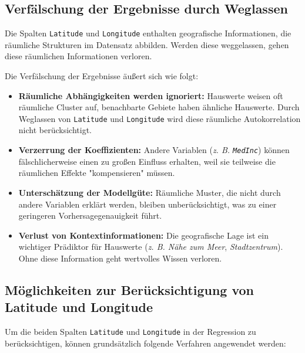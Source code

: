 \subsection{Verfälschung der Ergebnisse durch Weglassen}

Die Spalten \texttt{Latitude} und \texttt{Longitude} enthalten geografische Informationen, die räumliche Strukturen im Datensatz abbilden. Werden diese weggelassen, gehen diese räumlichen Informationen verloren.

Die Verfälschung der Ergebnisse äußert sich wie folgt:

\begin{itemize}
    \item \textbf{Räumliche Abhängigkeiten werden ignoriert:} Hauswerte weisen oft räumliche Cluster auf, benachbarte Gebiete haben ähnliche Hauswerte. Durch Weglassen von \texttt{Latitude} und \texttt{Longitude} wird diese räumliche Autokorrelation nicht berücksichtigt.
    \item \textbf{Verzerrung der Koeffizienten:} Andere Variablen (\textit{\acs{z. B.} \texttt{MedInc}}) können fälschlicherweise einen zu großen Einfluss erhalten, weil sie teilweise die räumlichen Effekte "kompensieren" müssen.
    \item \textbf{Unterschätzung der Modellgüte:} Räumliche Muster, die nicht durch andere Variablen erklärt werden, bleiben unberücksichtigt, was zu einer geringeren Vorhersagegenauigkeit führt.
    \item \textbf{Verlust von Kontextinformationen:} Die geografische Lage ist ein wichtiger Prädiktor für Hauswerte (\textit{\acs{z. B.} Nähe zum Meer}, \textit{Stadtzentrum}). Ohne diese Information geht wertvolles Wissen verloren.
\end{itemize}

\subsection{Möglichkeiten zur Berücksichtigung von Latitude und Longitude}

Um die beiden Spalten \texttt{Latitude} und \texttt{Longitude} in der Regression zu berücksichtigen, können grundsätzlich folgende Verfahren angewendet werden:

